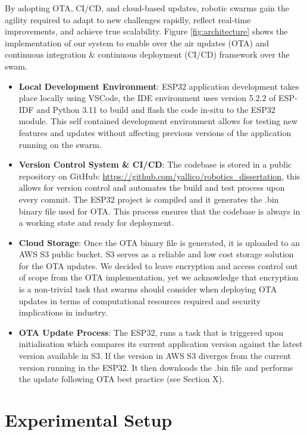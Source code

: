 \documentclass{report}
\begin{document}
By adopting OTA, CI/CD, and cloud-based updates, robotic swarms gain the agility required to adapt to new challenges rapidly, reflect real-time improvements, and achieve true scalability. Figure \ref{fig:architecture} shows the implementation of our system to enable over the air updates (OTA) and continuous integration \& continuous deployment (CI/CD) framework over the swam. 
\begin{itemize}
    \item \textbf{Local Development Environment}: ESP32 application development takes place locally using VSCode, the IDE environment uses version 5.2.2 of ESP-IDF and Python 3.11 to build and flash the code in-situ to the ESP32 module. This self contained development environment allows for testing new features and updates without affecting previous versions of the application running on the swarm.
    \item \textbf{Version Control System \& CI/CD}: The codebase is stored in a public repository on GitHub: \url{https://github.com/yallico/robotics_dissertation}, this allows for version control and automates the build and test process upon every commit. The ESP32 project is compiled and it generates the .bin binary file used for OTA. This process ensures that the codebase is always in a working state and ready for deployment.
    \item \textbf{Cloud Storage}: Once the OTA binary file is generated, it is uploaded to an AWS S3 public bucket. S3 serves as a reliable and low cost storage solution for the OTA updates. We decided to leave encryption and access control out of scope from the OTA implementation, yet we acknowledge that encryption is a non-trivial task that swarms should consider when deploying OTA updates in terms of computational resources required and security implications in industry. %
    \item \textbf{OTA Update Process}: The ESP32, runs a task that is triggered upon initialisation which compares its current application version against the latest version available in S3. If the version in AWS S3 diverges from the current version running in the ESP32. It then downloads the .bin file and performs the update following OTA best practice (see Section X). %

\end{itemize}


\section{Experimental Setup}
\lipsum[5-6] %
\end{document}
